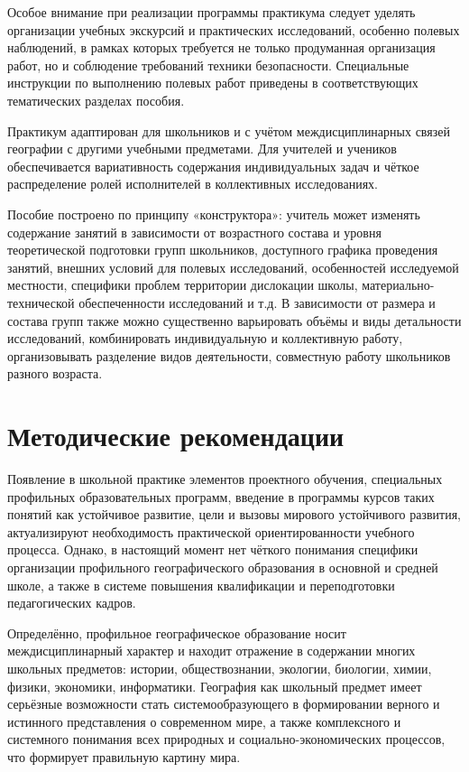 \documentclass[
  11pt,
  russian,
]{book}
\begin{document}
Особое внимание при реализации программы практикума следует уделять организации учебных экскурсий и практических исследований, особенно полевых наблюдений, в рамках которых требуется не только продуманная организация работ, но и соблюдение требований техники безопасности. Специальные инструкции по выполнению полевых работ приведены в соответствующих тематических разделах пособия.

Практикум адаптирован для школьников и с учётом междисциплинарных связей географии с другими учебными предметами. Для учителей и учеников обеспечивается вариативность содержания индивидуальных задач и чёткое распределение ролей исполнителей в коллективных исследованиях.

Пособие построено по принципу «конструктора»: учитель может изменять содержание занятий в зависимости от возрастного состава и уровня теоретической подготовки групп школьников, доступного графика проведения занятий, внешних условий для полевых исследований, особенностей исследуемой местности, специфики проблем территории дислокации школы, материально-технической обеспеченности исследований и т.д. В зависимости от размера и состава групп также можно существенно варьировать объёмы и виды детальности исследований, комбинировать индивидуальную и коллективную работу, организовывать разделение видов деятельности, совместную работу школьников разного возраста.

\hypertarget{ux43cux435ux442ux43eux434ux438ux447ux435ux441ux43aux438ux435-ux440ux435ux43aux43eux43cux435ux43dux434ux430ux446ux438ux438}{%
\section*{Методические рекомендации}\label{ux43cux435ux442ux43eux434ux438ux447ux435ux441ux43aux438ux435-ux440ux435ux43aux43eux43cux435ux43dux434ux430ux446ux438ux438}}

Появление в школьной практике элементов проектного обучения, специальных профильных образовательных программ, введение в программы курсов таких понятий как устойчивое развитие, цели и вызовы мирового устойчивого развития, актуализируют необходимость практической ориентированности учебного процесса. Однако, в настоящий момент нет чёткого понимания специфики организации профильного географического образования в основной и средней школе, а также в системе повышения квалификации и переподготовки педагогических кадров.

Определённо, профильное географическое образование носит междисциплинарный характер и находит отражение в содержании многих школьных предметов: истории, обществознании, экологии, биологии, химии, физики, экономики, информатики. География как школьный предмет имеет серьёзные возможности стать системообразующего в формировании верного и истинного представления о современном мире, а также комплексного и системного понимания всех природных и социально-экономических процессов, что формирует правильную картину мира.
\end{document}
